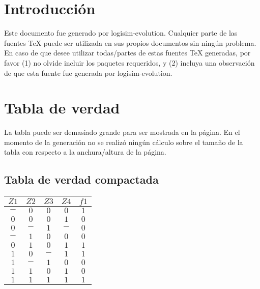 \documentclass [15pt,a4paper,twoside]{article}
\begin{document}
\section{Introducción}
Este documento fue generado por logisim-evolution. Cualquier parte de las fuentes TeX puede ser utilizada en sus propios documentos sin ningún problema. En caso de que desee utilizar todas/partes de estas fuentes TeX generadas, por favor (1) no olvide incluir los paquetes requeridos, y (2) incluya una observación de que esta fuente fue generada por logisim-evolution.
\section{Tabla de verdad}
La tabla puede ser demasiado grande para ser mostrada en la página. En el momento de la generación no se realizó ningún cálculo sobre el tamaño de la tabla con respecto a la anchura/altura de la página.
\subsection{Tabla de verdad compactada}
\begin{center}
\begin{tabular}{cccc|c}
$Z1$&$Z2$&$Z3$&$Z4$&$f1$\\
\hline
$-$&$0$&$0$&$0$&$1$\\
$0$&$0$&$0$&$1$&$0$\\
$0$&$-$&$1$&$-$&$0$\\
$-$&$1$&$0$&$0$&$0$\\
$0$&$1$&$0$&$1$&$1$\\
$1$&$0$&$-$&$1$&$1$\\
$1$&$-$&$1$&$0$&$0$\\
$1$&$1$&$0$&$1$&$0$\\
$1$&$1$&$1$&$1$&$1$\\

\end{tabular}
\end{center}
\end{document}
